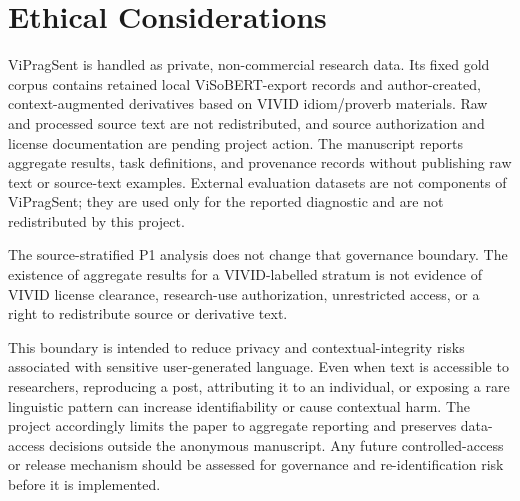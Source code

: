 \section{Ethical Considerations}
\label{sec:ethics}

ViPragSent is handled as private, non-commercial research data.  Its fixed gold corpus contains retained local ViSoBERT-export records and author-created, context-augmented derivatives based on VIVID idiom/proverb materials.  Raw and processed source text are not redistributed, and source authorization and license documentation are pending project action.  The manuscript reports aggregate results, task definitions, and provenance records without publishing raw text or source-text examples.  External evaluation datasets are not components of ViPragSent; they are used only for the reported diagnostic and are not redistributed by this project.

The source-stratified P1 analysis does not change that governance boundary. The existence of aggregate results for a VIVID-labelled stratum is not evidence of VIVID license clearance, research-use authorization, unrestricted access, or a right to redistribute source or derivative text.

This boundary is intended to reduce privacy and contextual-integrity risks associated with sensitive user-generated language.  Even when text is accessible to researchers, reproducing a post, attributing it to an individual, or exposing a rare linguistic pattern can increase identifiability or cause contextual harm.  The project accordingly limits the paper to aggregate reporting and preserves data-access decisions outside the anonymous manuscript.  Any future controlled-access or release mechanism should be assessed for governance and re-identification risk before it is implemented.

